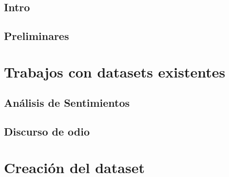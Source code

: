 \documentclass[11pt,a4paper,twoside]{tesis}
\begin{document}

\def\autor{Juan Manuel Pérez}
\def\tituloTesis{Técnicas y recursos para la detección automática de lenguaje discriminatorio en redes sociales}
\def\runtitulo{Técnicas y recursos para la detección automática de lenguaje discriminatorio en redes sociales}
\def\runtitle{Techniques and resources for the automatic detection of hate speech in social networks}
\def\director{Franco Luque}
\def\codirector{Agustín Gravano}
\def\lugarTrabajo{\makecell{
Departamento de Computación \\
Facultad de Cs. Exactas y Naturales \\
Universidad de Buenos Aires}}

\def\lugar{Buenos Aires, 2021}


%
\frontmatter
\pagestyle{empty}

%
\cleardoublepage

%
\cleardoublepage
%
\cleardoublepage
%
\cleardoublepage
\tableofcontents
%
\mainmatter
\pagestyle{headings}
%
%
%
\chapter{Intro}

%
\chapter{Preliminares}

\part{Trabajos con datasets existentes}
%
\chapter{Análisis de Sentimientos}

%
\chapter{Discurso de odio}

%
% 
\part{Creación del dataset}
%
\end{document}
